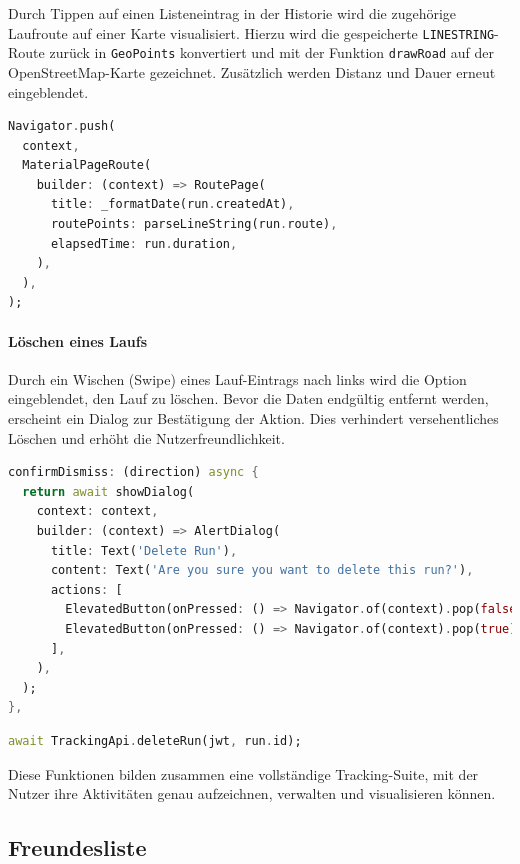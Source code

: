 \documentclass[11pt,a4paper]{article}
\begin{document}
Durch Tippen auf einen Listeneintrag in der Historie wird die zugehörige Laufroute auf einer Karte visualisiert. Hierzu wird die gespeicherte \texttt{LINESTRING}-Route zurück in \texttt{GeoPoints} konvertiert und mit der Funktion \texttt{drawRoad} auf der OpenStreetMap-Karte gezeichnet. Zusätzlich werden Distanz und Dauer erneut eingeblendet.

\begin{lstlisting}[language=Dart, caption=Navigation zur Detailansicht einer Route]
Navigator.push(
  context,
  MaterialPageRoute(
    builder: (context) => RoutePage(
      title: _formatDate(run.createdAt),
      routePoints: parseLineString(run.route),
      elapsedTime: run.duration,
    ),
  ),
);
\end{lstlisting}

\paragraph{Löschen eines Laufs}

Durch ein Wischen (Swipe) eines Lauf-Eintrags nach links wird die Option eingeblendet, den Lauf zu löschen. Bevor die Daten endgültig entfernt werden, erscheint ein Dialog zur Bestätigung der Aktion. Dies verhindert versehentliches Löschen und erhöht die Nutzerfreundlichkeit.

\begin{lstlisting}[language=Dart, caption=Löschbestätigung per Dialog]
confirmDismiss: (direction) async {
  return await showDialog(
    context: context,
    builder: (context) => AlertDialog(
      title: Text('Delete Run'),
      content: Text('Are you sure you want to delete this run?'),
      actions: [
        ElevatedButton(onPressed: () => Navigator.of(context).pop(false), child: Text('Cancel')),
        ElevatedButton(onPressed: () => Navigator.of(context).pop(true), child: Text('Delete')),
      ],
    ),
  );
},
\end{lstlisting}

\begin{lstlisting}[language=Dart, caption=Entfernen des Laufs aus der Datenbank]
await TrackingApi.deleteRun(jwt, run.id);
\end{lstlisting}

Diese Funktionen bilden zusammen eine vollständige Tracking-Suite, mit der Nutzer ihre Aktivitäten genau aufzeichnen, verwalten und visualisieren können.

\subsection{Freundesliste}
\end{document}
